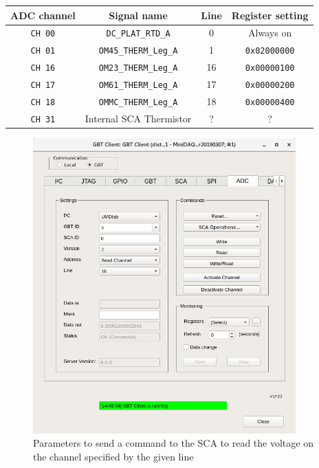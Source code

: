 \begin{center}
    \begin{tabular}{cccc}
        \toprule
        ADC channel & Signal name & Line & Register setting \\
        \midrule
        \texttt{CH 00} & \texttt{DC\_PLAT\_RTD\_A}    & 0  & Always on \\
        \texttt{CH 01} & \texttt{OM45\_THERM\_Leg\_A} & 1  & \texttt{0x02000000} \\
        \texttt{CH 16} & \texttt{OM23\_THERM\_Leg\_A} & 16 & \texttt{0x00000100} \\
        \texttt{CH 17} & \texttt{OM61\_THERM\_Leg\_A} & 17 & \texttt{0x00000200} \\
        \texttt{CH 18} & \texttt{OMMC\_THERM\_Leg\_A} & 18 & \texttt{0x00000400} \\
        \texttt{CH 31} & Internal SCA Thermistor      & ?  & ? \\
        \bottomrule
    \end{tabular}
    \label{tab:register-channel-correspondence}
\end{center}

\begin{figure}[ht]
    \centering
    \includegraphics[width=0.9\textwidth]{res/gbt_client_adc_readout_readchannel.png}
    \caption{
        Parameters to send a command to the SCA to read the voltage on the
        channel specified by the given line
    }
    \label{fig:adc-readout}
\end{figure}
